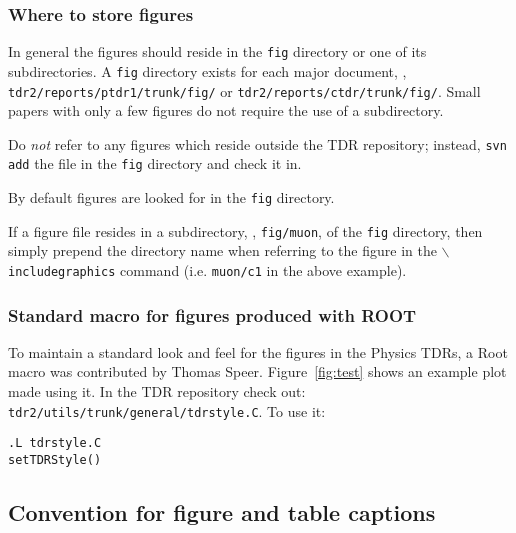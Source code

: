 \subsubsection{Where to store figures}

In general the figures should reside in the \texttt{fig} directory or one
of its subdirectories.
A \texttt{fig} directory exists for each major document, \eg,
\texttt{tdr2/reports/ptdr1/trunk/fig/} or \linebreak[3]\texttt{tdr2/reports/ctdr/trunk/fig/}. Small papers with only a few figures do not
require the use of a subdirectory.

Do \emph{not} refer to any figures which reside outside the
TDR repository; instead, \texttt{svn add} the file in the \texttt{fig}
directory and check it in.

By default figures are looked for in the \texttt{fig} directory.

If a figure file resides in a subdirectory, \eg, \texttt{fig/muon},
of the \texttt{fig} directory, then simply prepend the directory
name when referring to the figure in the
\texttt{$\backslash${}includegraphics} command (i.e. \texttt{muon/c1} in the
above example).



\subsubsection{Standard macro for figures produced with ROOT \label{sec:root}}

To maintain a standard look and feel for the figures in the Physics
TDRs, a Root macro was
contributed by Thomas Speer. Figure~\ref{fig:test} shows an example
plot made using it. In the TDR repository check out:
\texttt{tdr2/utils/trunk/general/tdrstyle.C}. To use it:
%
\begin{verbatim}
.L tdrstyle.C
setTDRStyle()
\end{verbatim}

\subsection{Convention for figure and table captions}

